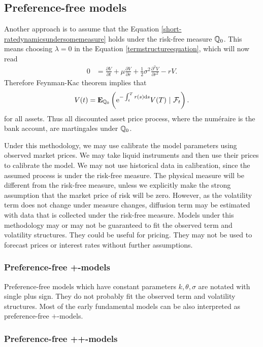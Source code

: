 \subsection{Preference-free models}

Another approach is to assume that the Equation \ref{short-ratedynamicsundersomemeasure} holds under the risk-free measure $\mathbb{Q}_0$. This means choosing $\lambda = 0$ in the Equation \ref{termstructureequation}, which will now read
\begin{align}
\label{termstructureequation2}
0 &= \frac{\partial V}{\partial t} + \mu \frac{\partial V}{\partial r} + \frac{1}{2} \sigma^2 \frac{\partial^2 V}{\partial r^2} - rV .
\end{align}
Therefore Feynman-Kac theorem implies that
	\begin{align}
		V(t) = \E_{\Pm_0} \left( \e^{-\int_t^T r(s) \dx s} V(T) \ | \ \F_t \right) .
	\end{align}
for all assets. Thus all discounted asset price process, where the num\'{e}raire is the bank account, are martingales under $\mathbb{Q}_0$.

Under this methodology, we may use calibrate the model parameters using observed market prices. We may take liquid instruments and then use their prices to calibrate the model. We may not use historical data in calibration, since the assumed process is under the risk-free measure. The physical measure will be different from the risk-free measure, unless we explicitly make the strong assumption that the market price of risk will be zero. However, as the volatility term does not change under measure changes, diffusion term may be estimated with data that is collected under the risk-free measure. Models under this methodology may or may not be guaranteed to fit the observed term and volatility structures. They could be useful for pricing. They may not be used to forecast prices or interest rates without further assumptions.

\subsubsection{Preference-free +-models}

Preference-free models which have constant parameters $k, \theta, \sigma$ are notated with single plus sign. They do not probably fit the observed term and volatility structures. Most of the early fundamental models can be also interpreted as preference-free $+$-models.

\subsubsection{Preference-free ++-models}

